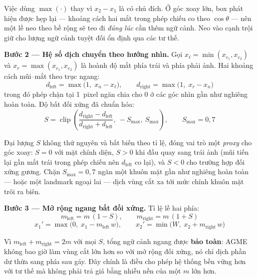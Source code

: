 Việc dùng $\max(\cdot)$ thay vì $x_2 - x_1$ là có chủ đích. Ở góc xoay lớn, box phát hiện được hẹp lại --- khoảng cách hai mắt trong phép chiếu co theo $\cos\theta$ --- nên một lề neo theo bề rộng sẽ teo đi \textit{đúng lúc} cần thêm ngữ cảnh. Neo vào cạnh trội giữ cho lượng ngữ cảnh tuyệt đối ổn định qua các tư thế.

\textbf{Bước 2 --- Hệ số dịch chuyển theo hướng nhìn.} Gọi $x_\ell = \min(x_{e_1}, x_{e_2})$ và $x_r = \max(x_{e_1}, x_{e_2})$ là hoành độ mắt phía trái và phía phải ảnh. Hai khoảng cách mũi--mắt theo trục ngang:
\begin{equation}
\label{eq:margin_dlr}
d_{\text{left}} = \max\big(1,\; x_n - x_\ell\big), \qquad d_{\text{right}} = \max\big(1,\; x_r - x_n\big)
\end{equation}
trong đó phép chặn tại 1~pixel ngăn chia cho 0 ở các góc nhìn gần như nghiêng hoàn toàn. Độ bất đối xứng đã chuẩn hóa:
\begin{equation}
\label{eq:margin_shift}
S = \operatorname{clip}\!\left(\frac{d_{\text{right}} - d_{\text{left}}}{d_{\text{right}} + d_{\text{left}}},\ -S_{\max},\ S_{\max}\right), \qquad S_{\max} = 0{,}7
\end{equation}

Đại lượng $S$ không thứ nguyên và bất biến theo tỉ lệ, đóng vai trò một \textit{proxy} cho góc xoay: $S = 0$ với mặt chính diện, $S > 0$ khi đầu quay sang trái ảnh (mũi tiến lại gần mắt trái trong phép chiếu nên $d_{\text{left}}$ co lại), và $S < 0$ cho trường hợp đối xứng gương. Chặn $S_{\max} = 0{,}7$ ngăn một khuôn mặt gần như nghiêng hoàn toàn --- hoặc một landmark ngoại lai --- dịch vùng cắt xa tới mức chính khuôn mặt trôi ra biên.

\textbf{Bước 3 --- Mở rộng ngang bất đối xứng.} Tỉ lệ lề hai phía:
\begin{equation}
\label{eq:margin_msplit}
m_{\text{left}} = m\,(1 - S), \qquad m_{\text{right}} = m\,(1 + S)
\end{equation}
\begin{equation}
\label{eq:margin_step2}
x_1' = \max\big(0,\; x_1 - m_{\text{left}}\, w\big), \qquad x_2' = \min\big(W,\; x_2 + m_{\text{right}}\, w\big)
\end{equation}

Vì $m_{\text{left}} + m_{\text{right}} = 2m$ với mọi $S$, tổng ngữ cảnh ngang được \textbf{bảo toàn}: AGME không bao giờ làm vùng cắt lớn hơn so với mở rộng đối xứng, nó chỉ dịch phần dư thừa sang phía sau gáy. Đây chính là điều cho phép hệ thống bền vững hơn với tư thế mà không phải trả giá bằng nhiễu nền của một $m$ lớn hơn.

